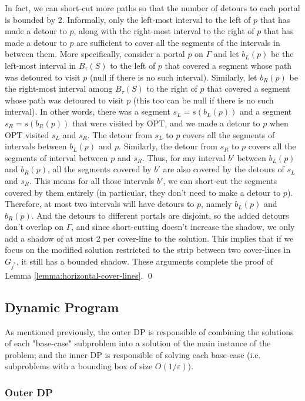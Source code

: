 \documentclass[10pt,a4paper]{amsart}
\theoremstyle{thmstyleone}
\newcommand{\eps}{\varepsilon}
\newcommand{\OPT}{{\text{OPT}}}
\begin{document}
In fact, we can short-cut more paths so that the number of detours to each portal is bounded by 2. Informally, only the left-most interval to the left of $p$ that has made a detour to $p$, along with the right-most interval to the right of $p$ that has made a detour to $p$ are sufficient to cover all the segments of the intervals in between them. More specifically, consider a portal $p$ on $\Gamma$ and let $b_L(p)$ be the left-most interval in $B_\tau(S)$ to the left of $p$ that covered a segment whose path was detoured to visit $p$ (null if there is no such interval). Similarly, let $b_R(p)$ be the right-most interval among $B_\tau(S)$ to the right of $p$ that covered a segment whose path was detoured to visit $p$ (this too can be  null if there is no such interval).
 In other words, there was a segment $s_L=s(b_L(p))$ and a segment $s_R=s(b_R(p))$ that
 were visited by $\OPT$, and we made a detour to $p$ when $\OPT$ visited $s_L$ and $s_R$. The detour from $s_L$ to $p$ covers all the segments of intervals between $b_L(p)$ and $p$. Similarly, the detour from $s_R$ to $p$ covers all the segments of interval between $p$ and $s_R$.
 Thus, for any interval $b'$ between $b_L(p)$ and $b_R(p)$, all the segments covered by $b'$ are also covered by the detours of $s_L$ and $s_R$. This means for
 all those intervals $b'$, we can short-cut the segments covered by them entirely (in particular, they don't need to make a detour to $p$). 
 Therefore, at most two intervals will have detours to $p$, namely $b_L(p)$
 and $b_R(p)$. And the detours to different portals are disjoint,
 so the added detours don't overlap on $\Gamma$, and since short-cutting doesn't increase the shadow, we only add a shadow of at most 2 per cover-line to the solution. This implies that if we focus on the modified solution restricted to the strip between two cover-lines in $G_{j^*}$, it still has a bounded shadow.
These arguments complete the proof of Lemma \ref{lemma:horizontal-cover-lines}. \qed

\subsection{Dynamic Program}\label{sec:DP}
As mentioned previously, the outer DP is responsible of combining the solutions of each "base-case" subproblem into a solution of the main instance of the problem; and the inner DP is responsible of solving each base-case (i.e. subproblems with a bounding box of size $O(1/\eps)$).

\subsubsection{Outer DP}\label{sec:outer-dp}
\end{document}
